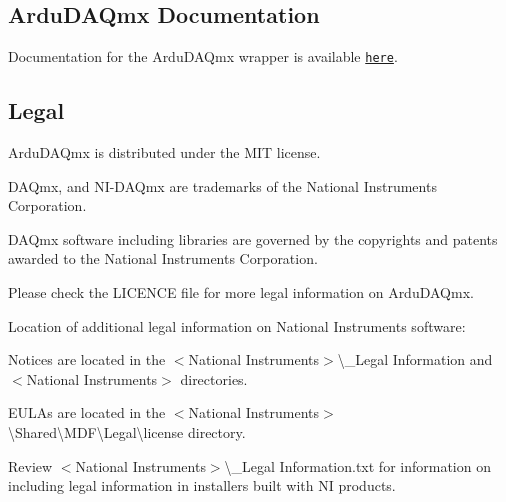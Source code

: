 \subsection*{Ardu\+D\+A\+Qmx Documentation}

Documentation for the Ardu\+D\+A\+Qmx wrapper is available \href{https://solaremperor.github.io/ArduDAQmx/}{\tt here}.

\subsection*{Legal}

Ardu\+D\+A\+Qmx is distributed under the M\+IT license.

D\+A\+Qmx, and N\+I-\/\+D\+A\+Qmx are trademarks of the National Instruments Corporation.

D\+A\+Qmx software including libraries are governed by the copyrights and patents awarded to the National Instruments Corporation.

Please check the {\ttfamily L\+I\+C\+E\+N\+CE} file for more legal information on Ardu\+D\+A\+Qmx.

Location of additional legal information on National Instruments software\+:
\begin{DoxyItemize}
\item Notices are located in the {\ttfamily $<$National Instruments$>$\textbackslash{}\+\_\+\+Legal Information and $<$National Instruments$>$} directories.
\item E\+U\+L\+As are located in the {\ttfamily $<$National Instruments$>$\textbackslash{}Shared\textbackslash{}M\+DF\textbackslash{}Legal\textbackslash{}license} directory.
\item Review {\ttfamily $<$National Instruments$>$\textbackslash{}\+\_\+\+Legal Information.\+txt} for information on including legal information in installers built with NI products. 
\end{DoxyItemize}